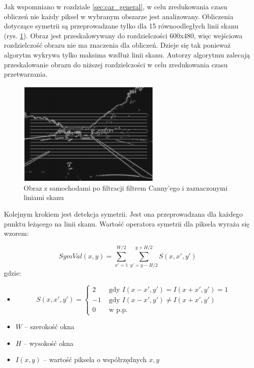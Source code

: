 Jak wspomniano w rozdziale \ref{sec:car_general}, w celu zredukowania czasu obliczeń nie każdy piksel w wybranym obszarze jest analizowany. 
Obliczenia dotyczące symetrii są przeprowadzane tylko dla 15 równoodległych linii skanu (rys. \ref{fig:car_scan_lines1}). 
Obraz jest przeskalowywany do rozdzielczości 600x480, więc wejściowa rozdzielczość obrazu nie ma znaczenia dla obliczeń. 
Dzieje się tak ponieważ algorytm wykrywa tylko maksima wzdłuż linii skanu. 
Autorzy algorytmu zalecają przeskalowanie obrazu do niższej rozdzielczości w celu zredukowania czasu przetwarzania.

\begin{figure}
  \centering
  \includegraphics[width=7cm]{img/car_lines.png}
  \caption{Obraz z samochodami po filtracji filtrem Canny'ego i zaznaczonymi liniami skanu\cite{T1}}
  \label{fig:car_scan_lines1}
\end{figure}

Kolejnym krokiem jest detekcja symetrii. 
Jest ona przeprowadzana dla każdego punktu leżącego na linii skanu.
Wartość operatora symetrii dla piksela wyraża się wzorem:

\begin{equation}
\label{eq:sym_detect}
SymVal(x,y)=\sum_{x'=1}^{W/2}\sum_{y'=y-H/2}^{y+H/2}S(x, x', y')
\end{equation}
gdzie:
\begin{itemize}
\item
\begin{equation}
S(x,x',y')=\begin{cases}
2 & \text{ gdy } I(x-x',y')=I(x+x',y')=1 \\ 
-1 & \text{ gdy } I(x-x',y')\neq I(x+x',y') \\ 
0 & \text{ w p.p. }
\end{cases}
\end{equation}
\item $W$ -- szerokość okna
\item $H$ -- wysokość okna
\item $I(x,y)$ -- wartość piksela o współrzędnych $x,y$
\end{itemize}

